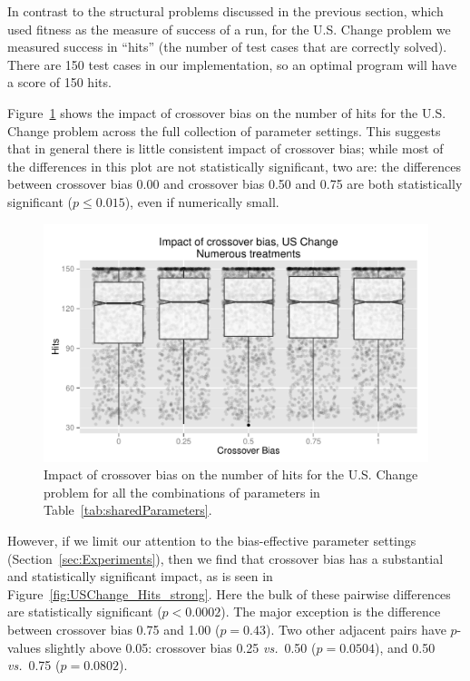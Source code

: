 \documentclass{sig-alternate}
\begin{document}
In contrast to the structural problems discussed in the previous section, which used fitness as the measure of success
of a run, for the U.S. Change problem we measured success in ``hits'' (the number of test cases that are correctly
solved). There are 150 test cases in our implementation, so an optimal program will have a score of 150 hits.

Figure~\ref{fig:USChange_Hits} shows the impact of crossover bias on the number of hits for the U.S. Change problem
across the full collection of parameter settings. This suggests that in general there is little consistent impact of
crossover bias; while most of the differences in this plot are not statistically significant, two are: the differences
between crossover bias 0.00 and crossover bias 0.50 and 0.75 are both statistically significant ($p \leq 0.015$), even
if numerically small.

\begin{figure}[tb]
\centering
\includegraphics[width=0.45 \textwidth]{Plots/US_change_hits.pdf}
\caption{Impact of crossover bias on the number of hits for the U.S. Change problem for all the combinations 
	of parameters in Table~\ref{tab:sharedParameters}.}
\label{fig:USChange_Hits}
\end{figure}

%
%
%
%

However, if we limit our attention to the bias-effective parameter settings (Section~\ref{sec:Experiments}), then we
find that crossover bias has a substantial and statistically significant impact, as is seen in
Figure~\ref{fig:USChange_Hits_strong}. Here the bulk of these pairwise differences are statistically significant
($p<0.0002$). The major exception is the difference between crossover bias 0.75 and 1.00 ($p=0.43$). Two other
adjacent pairs have $p$-values slightly above 0.05: crossover bias 0.25 \emph{vs.}\ 0.50 ($p=0.0504$), and 0.50
\emph{vs.}\ 0.75 ($p=0.0802$).
\end{document}
